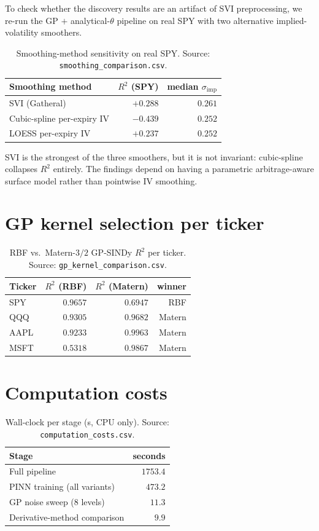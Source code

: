 \documentclass[10pt]{article}
\begin{document}
To check whether the discovery results are an artifact of SVI preprocessing, we re-run the GP $+$ analytical-$\theta$ pipeline on real SPY with two alternative implied-volatility smoothers.

\begin{table}[h]
\centering\footnotesize
\caption{Smoothing-method sensitivity on real SPY. Source: \texttt{smoothing\_comparison.csv}.}
\begin{tabular}{lrr}
\toprule
Smoothing method & $R^2$ (SPY) & median $\sigma_{\text{imp}}$ \\
\midrule
SVI (Gatheral)            & $\mathbf{+0.288}$ & $0.261$ \\
Cubic-spline per-expiry IV & $-0.439$ & $0.252$ \\
LOESS per-expiry IV        & $+0.237$ & $0.252$ \\
\bottomrule
\end{tabular}
\end{table}

SVI is the strongest of the three smoothers, but it is not invariant: cubic-spline collapses $R^2$ entirely. The findings depend on having a parametric arbitrage-aware surface model rather than pointwise IV smoothing.

\section{GP kernel selection per ticker}\label{app:gp-kernel}
\begin{table}[h]
\centering\footnotesize
\caption{RBF vs.\ Matern-$3/2$ GP-SINDy $R^2$ per ticker. Source: \texttt{gp\_kernel\_comparison.csv}.}
\begin{tabular}{lrrr}
\toprule
Ticker & $R^2$ (RBF) & $R^2$ (Matern) & winner \\
\midrule
SPY  & $0.9657$ & $0.6947$ & RBF \\
QQQ  & $0.9305$ & $0.9682$ & Matern \\
AAPL & $0.9233$ & $0.9963$ & Matern \\
MSFT & $0.5318$ & $0.9867$ & Matern \\
\bottomrule
\end{tabular}
\end{table}

\section{Computation costs}\label{app:cost}
\begin{table}[h]
\centering\footnotesize
\caption{Wall-clock per stage (s, CPU only). Source: \texttt{computation\_costs.csv}.}
\begin{tabular}{lr}
\toprule
Stage & seconds \\
\midrule
Full pipeline & $1753.4$ \\
PINN training (all variants) & $473.2$ \\
GP noise sweep (8 levels) & $11.3$ \\
Derivative-method comparison & $9.9$ \\
\bottomrule
\end{tabular}
\end{table}
\end{document}
